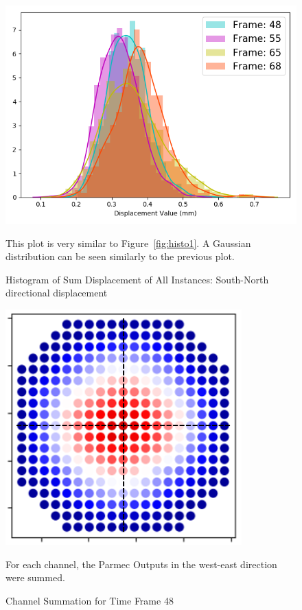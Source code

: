 \begin{figure}[p]
	\centering
	\includegraphics[scale=0.5]{Figures/histo2.png}
	\caption{Histogram of Sum Displacement of All Instances: South-North directional displacement } {This plot is very similar to Figure~\ref{fig:histo1}. A Gaussian distribution can be seen similarly to the previous plot.}
	\label{fig:histo2}
\end{figure}

\begin{figure}[ht]
	\centering
	\includegraphics[scale=0.85]{Figures/compositeLines.png}
	\caption{Channel Summation for Time Frame 48 } {For each channel, the Parmec Outputs in the west-east direction were summed.}
	\label{fig:composite}
\end{figure}

